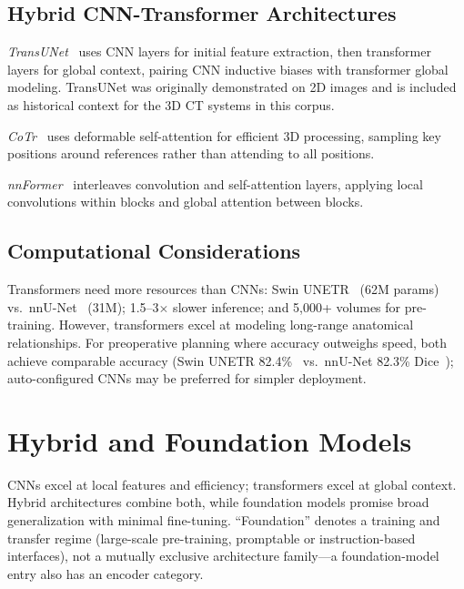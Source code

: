 \subsection{Hybrid CNN-Transformer Architectures}

\emph{TransUNet}~\cite{chen2024transunet} uses CNN layers for initial feature extraction, then transformer layers for global context, pairing CNN inductive biases with transformer global modeling. TransUNet was originally demonstrated on 2D images and is included as historical context for the 3D CT systems in this corpus.

\emph{CoTr}~\cite{xie2021cotr} uses deformable self-attention for efficient 3D processing, sampling key positions around references rather than attending to all positions.

\emph{nnFormer}~\cite{zhou2021nnformer} interleaves convolution and self-attention layers, applying local convolutions within blocks and global attention between blocks.

\subsection{Computational Considerations}

Transformers need more resources than CNNs: Swin UNETR~\cite{swinunetr2022} (62M params) vs.\ nnU-Net~\cite{isensee2021nnunet} (31M); 1.5--3$\times$ slower inference; and 5,000+ volumes for pre-training. However, transformers excel at modeling long-range anatomical relationships. For preoperative planning where accuracy outweighs speed, both achieve comparable accuracy (Swin UNETR 82.4\%~\cite{tang2022selfsupervised} vs.\ nnU-Net 82.3\% Dice~\cite{isensee2021nnunet}); auto-configured CNNs may be preferred for simpler deployment.

\section{Hybrid and Foundation Models}
\label{sec:hybrid}

CNNs excel at local features and efficiency; transformers excel at global context. Hybrid architectures combine both, while foundation models promise broad generalization with minimal fine-tuning. ``Foundation'' denotes a training and transfer regime (large-scale pre-training, promptable or instruction-based interfaces), not a mutually exclusive architecture family---a foundation-model entry also has an encoder category.

